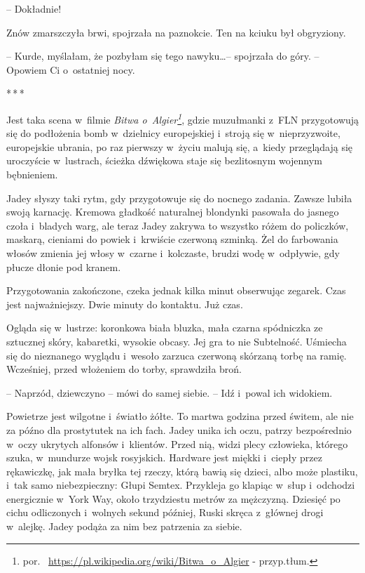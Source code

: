 \documentclass[oneside,polish,12pt,sfheadings]{mwbk}
\newcommand{\threeast}{\bigskip\par\centerline{*\,*\,*}\medskip\par}%
\begin{document}
-- Dokładnie!

Znów zmarszczyła brwi, spojrzała na paznokcie. Ten na kciuku był
obgryziony. 

-- Kurde, myślałam, że pozbyłam się tego nawyku\ldots --
spojrzała do góry.\emph{} -- Opowiem Ci o~ostatniej nocy.

\threeast

Jest taka scena w~filmie \emph{Bitwa o~Algier\footnote{por.~
\url{https://pl.wikipedia.org/wiki/Bitwa\_o\_Algier} - przyp.tłum.}}, gdzie
muzułmanki z~FLN przygotowują się do podłożenia bomb w~dzielnicy
europejskiej i~stroją się w~nieprzyzwoite, europejskie ubrania, po raz
pierwszy w~życiu malują się, a~kiedy przeglądają się uroczyście w~lustrach, ścieżka dźwiękowa staje się bezlitosnym wojennym bębnieniem.

Jadey słyszy taki rytm, gdy przygotowuje się do nocnego zadania. Zawsze
lubiła swoją karnację. Kremowa gładkość naturalnej blondynki pasowała do
jasnego czoła i~bladych warg, ale teraz Jadey zakrywa to wszystko różem
do policzków, maskarą, cieniami do powiek i~krwiście czerwoną szminką.
Żel do farbowania włosów zmienia jej włosy w~czarne i~kolczaste, brudzi
wodę w~odpływie, gdy płucze dłonie pod kranem.

Przygotowania zakończone, czeka jednak kilka minut obserwując zegarek.
Czas jest najważniejszy. Dwie minuty do kontaktu. Już czas.

Ogląda się w~lustrze: koronkowa biała bluzka, mała czarna spódniczka ze
sztucznej skóry, kabaretki, wysokie obcasy. Jej gra to nie Subtelność.
Uśmiecha się do nieznanego wyglądu i~wesoło zarzuca czerwoną skórzaną
torbę na ramię. Wcześniej, przed włożeniem do torby, sprawdziła broń.

-- Naprzód, dziewczyno -- mówi do samej siebie. -- Idź i~powal ich
widokiem.

Powietrze jest wilgotne i~światło żółte. To martwa godzina przed świtem,
ale nie za późno dla prostytutek na ich fach. Jadey unika ich oczu,
patrzy bezpośrednio w~oczy ukrytych alfonsów i~klientów. Przed nią,
widzi plecy człowieka, którego szuka, w~mundurze wojsk rosyjskich.
Hardware jest miękki i~ciepły przez rękawiczkę, jak mała bryłka tej
rzeczy, którą bawią się dzieci, albo może plastiku, i~tak samo
niebezpieczny: Głupi Semtex. Przykleja go klapiąc w~słup i~odchodzi
energicznie w~York Way, około trzydziestu metrów za mężczyzną. Dziesięć
po cichu odliczonych i~wolnych sekund później, Ruski skręca z~głównej
drogi w~alejkę. Jadey podąża za nim bez patrzenia za siebie.
\end{document}
